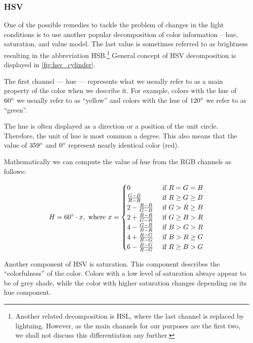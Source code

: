 \subsubsection{HSV}

One of the possible remedies to tackle the problem of changes in the light conditions is to use another popular decomposition of color information -- hue, saturation, and value model. The last value is sometimes referred to as brightness resulting in the abbreviation HSB.\footnote{Another related decomposition is HSL, where the last channel is replaced by lightning. However, as the main channels for our purposes are the first two, we shall not discuss this differentiation any further.} General concept of HSV decomposition is displayed in \autoref{fig:hsv_cylinder}.

The first channel --- hue --- represents what we usually refer to as a main property of the color when we describe it. For example, colors with the hue of $60\degree$ we usually refer to as ``yellow'' and colors with the hue of $120\degree$ we refer to as ``green''.

The hue is often displayed as a direction or a position of the unit circle. Therefore, the unit of hue is most common a degree. This also means that the value of $359\degree$ and $0\degree$ represent nearly identical color (red).

Mathematically we can compute the value of hue from the RGB channels as
follows:

$$H = 60\degree \cdot x, \text{ where } x = 
\begin{cases}
0 & \text{ if } R = G = B \\
\frac{G - B}{R - B} & \text{ if } R \geq G \geq B \\
2 - \frac{R - B}{G - B} & \text{ if } G > R \geq B \\
2 + \frac{B - R}{G - R} & \text{ if } G \geq B > R \\
4 - \frac{G - R}{B - R} & \text{ if } B > G > R \\
4 + \frac{R - G}{B - G} & \text{ if } B > R \geq G \\
6 - \frac{B - G}{R - G} & \text{ if } R \geq B > G
\end{cases}$$

Another component of HSV is saturation. This component describes the ``colorfulness'' of the color. Colors with a low level of saturation always appear to be of grey shade, while the color with higher saturation changes depending on its hue component.

